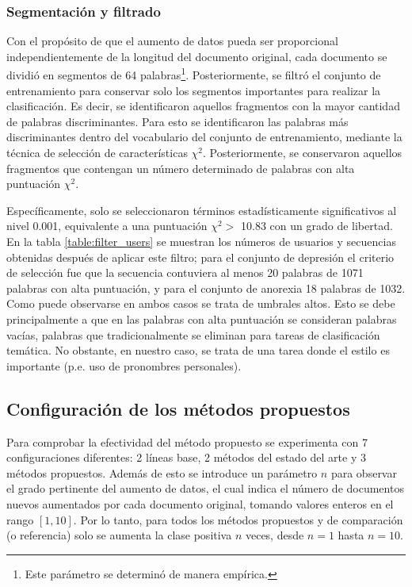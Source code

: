 \subsubsection{Segmentación y filtrado}
Con el propósito de que el aumento de datos pueda ser proporcional independientemente de la longitud del documento original, cada documento se dividió en segmentos de 64 palabras\footnote{Este parámetro se determinó de manera empírica.}. Posteriormente, se filtró el conjunto de entrenamiento para conservar solo los segmentos importantes para realizar la clasificación. Es decir, se identificaron aquellos fragmentos con la mayor cantidad de palabras discriminantes. Para esto se identificaron las palabras más discriminantes dentro del vocabulario del conjunto de entrenamiento, mediante la técnica de selección de características $\chi^2$. Posteriormente, se conservaron aquellos fragmentos  que contengan un número determinado de palabras con alta puntuación $\chi^2$. 

Específicamente, solo se seleccionaron términos estadísticamente significativos al nivel 0.001, equivalente a una puntuación $\chi^2 > $ 10.83 con un grado de libertad. En la tabla \ref{table:filter_users} se muestran los números de usuarios y secuencias obtenidas después de aplicar este filtro; para el conjunto de depresión el criterio de selección fue que la secuencia contuviera al menos 20 palabras de 1071 palabras con alta puntuación, y para el conjunto de anorexia 18 palabras de 1032. Como puede observarse en ambos casos se trata de umbrales altos. Esto se debe principalmente a que en las palabras con alta puntuación se consideran palabras vacías, palabras que tradicionalmente se eliminan para tareas de clasificación temática. No obstante, en nuestro caso,  se trata de una tarea donde el estilo es importante (p.e. uso de pronombres personales).



\subsection{Configuración de los métodos propuestos}

Para comprobar la efectividad del método propuesto se experimenta con 7 configuraciones diferentes: 2 líneas base, 2 métodos del estado del arte y 3 métodos propuestos. Además de esto se introduce un parámetro $n$ para observar el grado pertinente del aumento de datos, el cual indica el número de documentos nuevos aumentados por cada documento original, tomando valores enteros en el rango $[1,10]$. Por lo tanto, para todos los métodos propuestos y de comparación (o referencia) solo se aumenta la clase positiva $n$ veces, desde $n=1$ hasta $n=10$.


